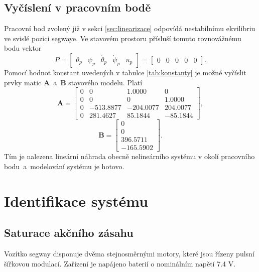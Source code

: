 \documentclass[conference]{IEEEtran}
\begin{document}
\subsection{Vyčíslení v pracovním bodě}

Pracovní bod zvolený již v sekci \ref{sec:linearizace} odpovídá nestabilnímu ekvilibriu ve svislé pozici segwaye.
Ve stavovém prostoru přísluší tomuto rovnovážnému bodu vektor 
\begin{equation}
    P = \begin{bmatrix}
        \theta_p &    \psi_p &     \dot{\theta}_p &     \dot{\psi}_p & u_p
    \end{bmatrix} = \begin{bmatrix}
        0 & 0 & 0 & 0 & 0
    \end{bmatrix}.
    \label{eq:prac_bod}
\end{equation}
Pomocí hodnot konstant uvedených v tabulce \ref{tab:konstanty} je možné vyčíslit prvky matic $\mathbf{A}$~a~$\mathbf{B}$ stavového modelu. Platí
\begin{equation}
        \mathbf{A} = \begin{bmatrix}
            0 &        0 &    1.0000 &        0 \\
            0 &        0 &         0 &   1.0000 \\
            0 &-513.8877 & -204.0077 & 204.0077 \\
            0 & 281.4627 &   85.1844 & -85.1844
        \end{bmatrix},
    \end{equation}
    \begin{equation}
        \mathbf{B} = \begin{bmatrix}
            0 \\ 0 \\   396.5711 \\-165.5902
        \end{bmatrix}.
        \label{eq:matice_linearizovane}
    \end{equation}
Tím je nalezena lineární náhrada obecně nelineárního systému v okolí pracovního bodu~a~modelování systému je hotovo.

\section{Identifikace systému}

\subsection{Saturace akčního zásahu}
\label{sec:ubat}
Vozítko segway disponuje dvěma stejnosměrnými motory, které jsou řízeny pulsní šířkovou
modulací. Zařízení je napájeno baterií o nominálním napětí 7.4 \si{V}.
\end{document}
